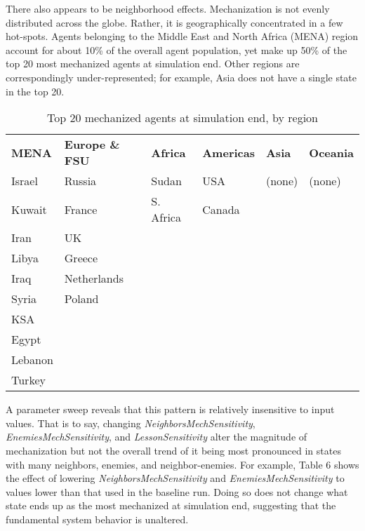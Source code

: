 \documentclass{article}
\begin{document}
There also appears to be neighborhood effects. Mechanization is not evenly
distributed across the globe. Rather, it is geographically concentrated in a few
hot-spots. Agents belonging to the Middle East and North Africa (MENA) region
account for about 10\% of the overall agent population, yet make up 50\% of the
top 20 most mechanized agents at simulation end. Other regions
are correspondingly under-represented; for example, Asia does not have a single
state in the top 20.

\begin{table}[h]
	\centering
	\caption{Top 20 mechanized agents at simulation end, by region}
	\begin{tabular}{|l l l l l l|}
		\hline
		\textbf{MENA} & \textbf{Europe \& FSU} & \textbf{Africa} & \textbf{Americas} & \textbf{Asia} & \textbf{Oceania} \\
		Israel       & Russia         & Sudan        & USA    & (none) & (none) \\
		Kuwait       & France         & S. Africa    & Canada &        &        \\
		Iran         & UK             &              &        &        &        \\
		Libya        & Greece         &              &        &        &        \\
		Iraq         & Netherlands    &              &        &        &        \\
		Syria        & Poland         &              &        &        &        \\
		KSA          &                &              &        &        &        \\
		Egypt        &                &              &        &        &        \\
		Lebanon      &                &              &        &        &        \\
		Turkey       &                &              &        &        &        \\
		\hline
	\end{tabular}
\end{table}

A parameter sweep reveals that this pattern is relatively insensitive
to input values. That is to say, changing \textit{NeighborsMechSensitivity}, 
\textit{EnemiesMechSensitivity}, and \textit{LessonSensitivity} alter the
magnitude of mechanization but not the overall trend of it being most pronounced
in states with many neighbors, enemies, and neighbor-enemies. For example, Table
6 shows the effect of lowering \textit{NeighborsMechSensitivity} and 
\textit{EnemiesMechSensitivity} to values lower than that used in the baseline
run. Doing so does not change what state ends up as the most mechanized at
simulation end, suggesting that the fundamental system behavior is unaltered. 
\end{document}
